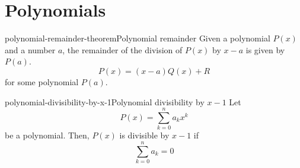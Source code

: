 \documentclass[preview]{standalone}
\begin{document}
\genpage

\section{Polynomials}

\begin{snippettheorem}{polynomial-remainder-theorem}{Polynomial remainder}
    Given a polynomial \(P(x)\) and a number \(a\), the remainder of the division of \(P(x)\) by \(x-a\)
    is given by \(P(a)\).
    \[ P(x)=(x-a)Q(x) + R \]
    for some polynomial \(P(a)\).
\end{snippettheorem}

\begin{snippetcorollary}{polynomial-divisibility-by-x-1}{Polynomial divisibility by \(x-1\)}
    Let
    \[ P(x) = \sum_{k=0}^n a_k x^k \]
    be a polynomial. Then, \(P(x)\)
    is divisible by \(x-1\) if
    \[ \sum_{k=0}^n a_k = 0 \]
\end{snippetcorollary}
\end{document}
